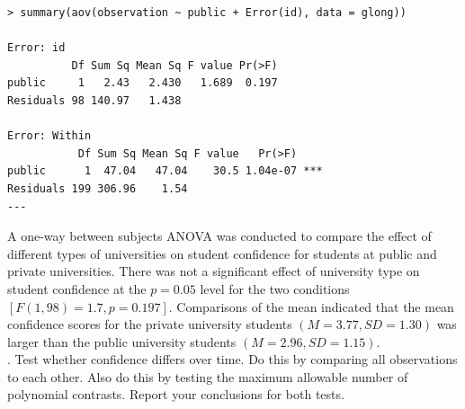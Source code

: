 \documentclass[onecolumn,10pt]{jhwhw}
\begin{document}
\begin{lstlisting}
> summary(aov(observation ~ public + Error(id), data = glong))

Error: id
          Df Sum Sq Mean Sq F value Pr(>F)
public     1   2.43   2.430   1.689  0.197
Residuals 98 140.97   1.438

Error: Within
           Df Sum Sq Mean Sq F value   Pr(>F)
public      1  47.04   47.04    30.5 1.04e-07 ***
Residuals 199 306.96    1.54
---
\end{lstlisting}

A one-way between subjects ANOVA was conducted to compare the effect of different types of universities on student confidence for students at public and private universities. There was not a significant effect of university type on student confidence at the $p=0.05$ level for the two conditions $[F(1, 98)=1.7, p =0.197]$. Comparisons of the mean indicated that the mean confidence scores for the private university students $(M=3.77, SD=1.30)$ was larger than the public university students $(M=2.96, SD=1.15)$.\\

. Test whether confidence differs over time. Do this by comparing all observations to each other. Also do this by testing the maximum allowable number of polynomial contrasts. Report your conclusions for both tests.\\


\end{document}
